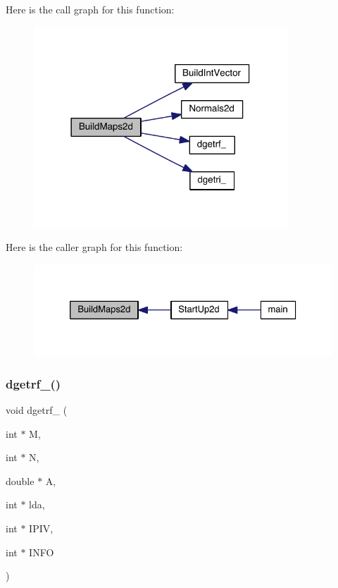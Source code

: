 Here is the call graph for this function\+:\nopagebreak
\begin{figure}[H]
\begin{center}
\leavevmode
\includegraphics[width=270pt]{a00596_ac0114aa8a9d094bad20943e1b79ba473_cgraph}
\end{center}
\end{figure}
Here is the caller graph for this function\+:\nopagebreak
\begin{figure}[H]
\begin{center}
\leavevmode
\includegraphics[width=326pt]{a00596_ac0114aa8a9d094bad20943e1b79ba473_icgraph}
\end{center}
\end{figure}
\mbox{\label{a00596_a9ade98d71580bb70e0ddf663d30e4bb4}} 
\subsubsection{\texorpdfstring{dgetrf\+\_\+()}{dgetrf\_()}}
{\footnotesize\ttfamily void dgetrf\+\_\+ (\begin{DoxyParamCaption}\item[{int $\ast$}]{M,  }\item[{int $\ast$}]{N,  }\item[{double $\ast$}]{A,  }\item[{int $\ast$}]{lda,  }\item[{int $\ast$}]{I\+P\+IV,  }\item[{int $\ast$}]{I\+N\+FO }\end{DoxyParamCaption})}

